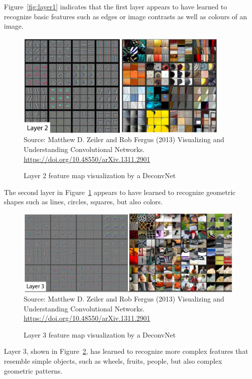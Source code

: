 Figure~\ref{fig:layer1} indicates that the first layer appears to have learned to recognize basic features such as edges or image contrasts as well as colours of an image. 

\begin{figure}
\centering
\includegraphics[height=2in]{layer2.png} \\
\vspace{\baselineskip}
\scriptsize Source: Matthew D. Zeiler and Rob Fergus (2013) Visualizing and Understanding Convolutional Networks. \url{https://doi.org/10.48550/arXiv.1311.2901}
\caption{Layer 2 feature map visualization by a DeconvNet}
\label{fig:layer2}
\end{figure}

The second layer in Figure~\ref{fig:layer2} appears to have learned to recognize geometric shapes such as lines, circles, squares, but also colors.

\begin{figure}
\centering
\includegraphics[width=\textwidth]{layer3.png} \\
\vspace{\baselineskip}
\scriptsize Source: Matthew D. Zeiler and Rob Fergus (2013) Visualizing and Understanding Convolutional Networks. \url{https://doi.org/10.48550/arXiv.1311.2901}
\caption{Layer 3 feature map visualization by a DeconvNet}
\label{fig:layer3}
\end{figure}

Layer 3, shown in Figure~\ref{fig:layer3}, has learned to recognize more complex features that resemble simple objects, such as wheels, fruits, people, but also complex geometric patterns. 

